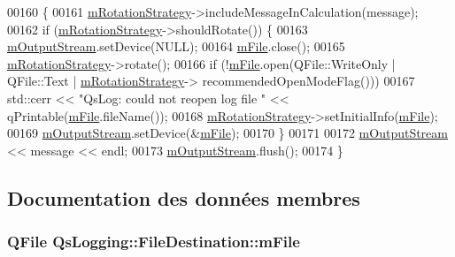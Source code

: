 \begin{DoxyCode}
00160 \{
00161     \hyperlink{classQsLogging_1_1FileDestination_ab20945842bd063b5cbe82485168be1f0}{mRotationStrategy}->includeMessageInCalculation(message);
00162     \textcolor{keywordflow}{if} (\hyperlink{classQsLogging_1_1FileDestination_ab20945842bd063b5cbe82485168be1f0}{mRotationStrategy}->shouldRotate()) \{
00163         \hyperlink{classQsLogging_1_1FileDestination_a10f0aa5513ec40d3e362179b084a43d6}{mOutputStream}.setDevice(NULL);
00164         \hyperlink{classQsLogging_1_1FileDestination_a1de182fa4efefa21e6545757f1a04eb2}{mFile}.close();
00165         \hyperlink{classQsLogging_1_1FileDestination_ab20945842bd063b5cbe82485168be1f0}{mRotationStrategy}->rotate();
00166         \textcolor{keywordflow}{if} (!\hyperlink{classQsLogging_1_1FileDestination_a1de182fa4efefa21e6545757f1a04eb2}{mFile}.open(QFile::WriteOnly | QFile::Text | \hyperlink{classQsLogging_1_1FileDestination_ab20945842bd063b5cbe82485168be1f0}{mRotationStrategy}->
      recommendedOpenModeFlag()))
00167             std::cerr << \textcolor{stringliteral}{"QsLog: could not reopen log file "} << qPrintable(\hyperlink{classQsLogging_1_1FileDestination_a1de182fa4efefa21e6545757f1a04eb2}{mFile}.fileName());
00168         \hyperlink{classQsLogging_1_1FileDestination_ab20945842bd063b5cbe82485168be1f0}{mRotationStrategy}->setInitialInfo(\hyperlink{classQsLogging_1_1FileDestination_a1de182fa4efefa21e6545757f1a04eb2}{mFile});
00169         \hyperlink{classQsLogging_1_1FileDestination_a10f0aa5513ec40d3e362179b084a43d6}{mOutputStream}.setDevice(&\hyperlink{classQsLogging_1_1FileDestination_a1de182fa4efefa21e6545757f1a04eb2}{mFile});
00170     \}
00171 
00172     \hyperlink{classQsLogging_1_1FileDestination_a10f0aa5513ec40d3e362179b084a43d6}{mOutputStream} << message << endl;
00173     \hyperlink{classQsLogging_1_1FileDestination_a10f0aa5513ec40d3e362179b084a43d6}{mOutputStream}.flush();
00174 \}
\end{DoxyCode}


\subsection{Documentation des données membres}
\hypertarget{classQsLogging_1_1FileDestination_a1de182fa4efefa21e6545757f1a04eb2}{
\subsubsection[{m\-File}]{\setlength{\rightskip}{0pt plus 5cm}Q\-File Qs\-Logging\-::\-File\-Destination\-::m\-File\hspace{0.3cm}{\ttfamily [private]}}}\label{classQsLogging_1_1FileDestination_a1de182fa4efefa21e6545757f1a04eb2}


